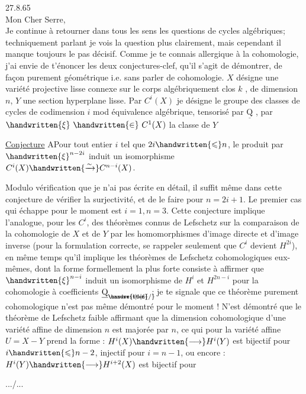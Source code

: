 27.8.65\\

Mon Cher Serre,\\

Je continue à retourner dans tous les sens les questions de cycles
algébriques; techniquement parlant je vois la question plus clairement, mais
cependant il manque toujours le pas décisif. Comme je te connais allergique
à la cohomologie, j'ai envie de t'énoncer les deux conjectures-clef, qu'il
s'agit de démontrer, de façon purement géométrique i.e. sans parler de
cohomologie. $X$ désigne une variété projective lisse connexe sur le corps
algébriquement clos $k$ , de dimension $n$, $Y$ une section hyperplane lisse.
Par $C^i(X)$ je désigne le groupe des classes de cycles de codimension $i$
mod équivalence algébrique, tensorisé par $\underline{\mathrm Q}$ , par $\handwritten{\xi}\ \handwritten{\in}\ C^1(X)$ la classe
de $Y$

\uline{Conjecture} A\qquad Pour tout entier $i$ tel que $2i\handwritten{\leqslant}n$, le produit par $\handwritten{\xi}^{n-2i}$
induit un isomorphisme $C^i(X)\handwritten{\xrightarrow{\sim}}C^{n-i}(X)$.

Modulo vérification que je n'ai pas écrite en détail, il suffit
même dans cette conjecture de vérifier la surjectivité, et de le faire pour
$n=2i+1$. Le premier cas qui échappe pour le moment est $i=1,n=3$.
Cette conjecture implique l'analogue, pour les $C^i$, des théorèmes connus
de Lefschetz sur la comparaison de la cohomologie de $X$ et de $Y$ par les
homomorphismes d'image directe et d'image inverse (pour la formulation
correcte, se rappeler seulement que $C^i$ devient $H^{2i}$), en même temps
qu'il implique les théorèmes de Lefschetz cohomologiques eux-mêmes, dont
la forme formellement la plus forte consiste à affirmer que $\handwritten{\xi}^{n-i}$ induit
un isomorphisme de $H^i$ et $H^{2n-i}$ pour la cohomologie à coefficients $\underline{\mathrm Q}_{\rlap{$\scriptstyle\handwritten{/}$}\unsure{\mathrm{l}|1|\ell}}$ ;
je te signale que ce théorème purement cohomologique n'est pas même démontré
pour le moment ! N'est démontré que le théorème de Lefschetz
\textquotedbl{}faible\textquotedbl{} affirmant que la dimension cohomologique d'une variété affine
de dimension $n$ est majorée par $n$, ce qui pour la variété affine
$U=X-Y$ prend la forme : $H^i(X)\handwritten{\longrightarrow}H^i(Y)$ est bijectif pour $i\handwritten{\leqslant}n-2$,
injectif pour $i=n-1$, ou encore : $H^i(Y)\handwritten{\longrightarrow}H^{i+2}(X)$ est bijectif pour

\hfill .../...
